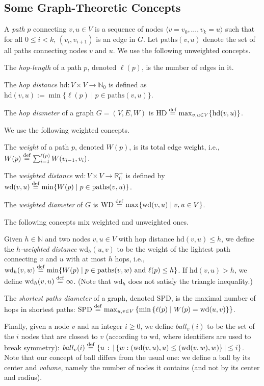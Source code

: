\documentclass[letterpaper,11pt]{article}
\newcommand{\N}{\mathbb{N}}
\newcommand{\R}{\mathbb{R}}
\newcommand{\Set}[1]{\left\{ #1 \right\}}
\newcommand{\DEF}{\ensuremath{\stackrel{\rm def}{=}}}
\newcommand{\Paths}{\mathrm{paths}}
\newcommand{\Hd}{\mathrm{hd}}
\newcommand{\HD}{\mathrm{HD}}
\newcommand{\Wd}{\mathrm{wd}}
\newcommand{\WD}{\mathrm{WD}}
\newcommand{\SPD}{\mathrm{SPD}}
\newcommand{\Ball}{\mathit{ball}}
\begin{document}
\subsection{Some Graph-Theoretic Concepts} 
A \emph{path} $p$ connecting
$v,u\in V$ is a sequence of nodes
$\langle v=v_0,\ldots,v_k=u\rangle$ such that for
all $0\le i<k$, $(v_i,v_{i+1})$ is an edge in $G$. 
Let $\Paths(v,u)$ denote  the set of all paths
connecting nodes $v$ and $u$.  We use the following unweighted concepts.
\begin{compactitem}
\item The \emph{hop-length} of a path $p$, denoted
$\ell(p)$,  is the number of
edges in it.
\item The \emph{hop distance} $\Hd:V\times V\to \N_0$ is defined as
$\Hd(v,u):=\min\{\ell(p)\mid{p\in\Paths(v,u)}\}$.
\item The \emph{hop diameter} of a graph $G=(V,E,W)$ is
$\HD\DEF\max_{v,u\in V}\{\Hd(v,u)\}$.
\end{compactitem}
We use the following weighted concepts.
\begin{compactitem}
\item The \emph{weight} of a path $p$, denoted $W(p)$, is its total
edge weight, i.e., $W(p)\DEF\sum_{i=1}^{\ell(p)} W(v_{i-1},v_i)$.
\item The \emph{weighted distance} $\Wd:V\times V\to \R^+_0$
is defined by $\Wd(v,u)\DEF\min\{W(p)\mid{p\in\Paths(v,u)}\}$.
\item The \emph{weighted diameter} of $G$ is
$\WD\DEF\max\{\Wd(v,u)\mid{v,u\in V}\}$.
\end{compactitem}
The following concepts mix weighted and unweighted ones.
\begin{compactitem}
\item Given $h\in\N$ and two nodes $v,u\in V$ with hop
  distance $\Hd(v,u)\leq h$, we define the \emph{$h$-weighted
    distance} $\Wd_h(u,v)$ to be the weight of the lightest path
  connecting $v$ and $u$ with at most $h$ hops, i.e.,
  $\Wd_h(v,w)\DEF\min\{W(p)\mid p\in \Paths(v,w) \textrm{ and }
  \ell(p)\leq h\}$. If $\Hd(v,u)>h$, we define $\Wd_h(v,u)\DEF\infty$.
  (Note that $\Wd_h$  does not satisfy the
  triangle inequality.)
\item The \emph{shortest paths diameter} of a graph, denoted $\SPD$,
  is the maximal number of 
    hops in shortest paths:
    $\SPD\DEF\max_{u,v\in V}\Set{\min\Set{\ell(p)\mid W(p)=\Wd(u,v)}}$.
\end{compactitem}

Finally, given a node $v$ and an integer $i\ge0$, we define $\Ball_v(i)$ to be
the set  of the $i$ nodes that are closest to $v$ (according to $\Wd$, where
identifiers are used to break symmetry): $\displaystyle
\Ball_v(i)\DEF\Set{u\,:\,|\Set{w:(\Wd(v,u),u)\le(\Wd(v,w),w)}|\leq i}$. Note
that our concept of ball differs from the usual one: we define a ball by its
center and \emph{volume}, namely the number of nodes it contains (and not by its
center and radius).
\end{document}
